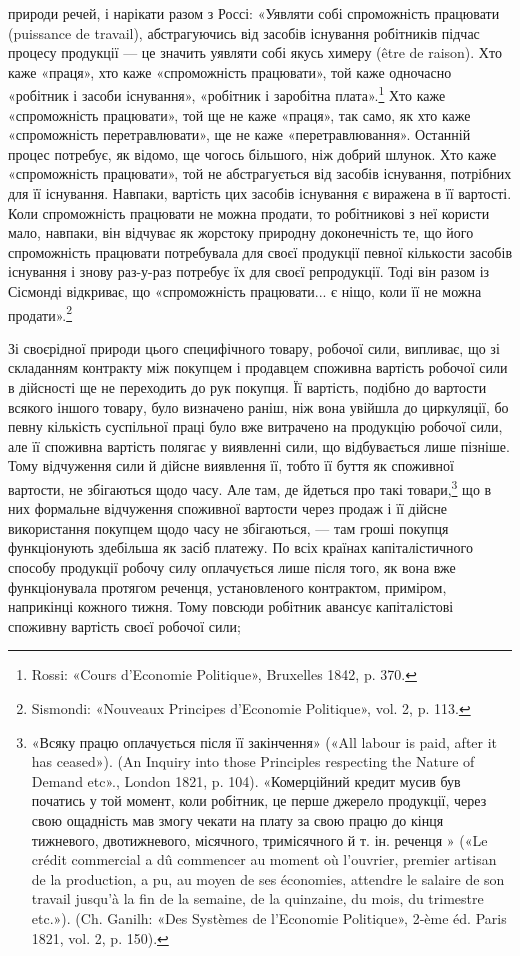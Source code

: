 \parcont{}  %
природи речей, і нарікати разом з Россі: «Уявляти собі спроможність
працювати (puissance de travail), абстрагуючись від засобів
існування робітників підчас процесу продукції — це значить
уявляти собі якусь химеру (être de raison). Хто каже «праця»,
хто каже «спроможність працювати», той каже одночасно «робітник
і засоби існування», «робітник і заробітна плата».\footnote{
Rossi: «Cours d’Economie Politique», Bruxelles 1842, p. 370.
} Хто
каже «спроможність працювати», той ще не каже «праця», так
само, як хто каже «спроможність перетравлювати», ще не каже
«перетравлювання». Останній процес потребує, як відомо, ще
чогось більшого, ніж добрий шлунок. Хто каже «спроможність
працювати», той не абстрагується від засобів існування, потрібних
для її існування. Навпаки, вартість цих засобів існування
є виражена в її вартості. Коли спроможність працювати не можна
продати, то робітникові з неї користи мало, навпаки, він відчуває
як жорстоку природну доконечність те, що його спроможність
працювати потребувала для своєї продукції певної кількости засобів
існування і знову раз-у-раз потребує їх для своєї репродукції.
Тоді він разом із Сісмонді відкриває, що «спроможність
працювати... є ніщо, коли її не можна продати».\footnote{
Sismondi: «Nouveaux Principes d’Economie Politique», vol. 2, p. 113.
}

Зі своєрідної природи цього специфічного товару, робочої
сили, випливає, що зі складанням контракту між покупцем і
продавцем споживна вартість робочої сили в дійсності ще не
переходить до рук покупця. Її вартість, подібно до вартости
всякого іншого товару, було визначено раніш, ніж вона увійшла
до циркуляції, бо певну кількість суспільної праці було вже
витрачено на продукцію робочої сили, але її споживна вартість
полягає у виявленні сили, що відбувається лише пізніше. Тому
відчуження сили й дійсне виявлення її, тобто її буття як споживної
вартости, не збігаються щодо часу. Але там, де йдеться
про такі товари,\footnote{
«Всяку працю оплачується після її закінчення» («All labour is
paid, after it has ceased»). (An Inquiry into those Principles respecting
the Nature of Demand etc»., London 1821, p. 104). «Комерційний кредит
мусив був початись у той момент, коли робітник, це перше джерело продукції,
через свою ощадність мав змогу чекати на плату за свою працю
до кінця тижневого, двотижневого, місячного, тримісячного й т. ін. реченця
» («Le crédit commercial a dû commencer au moment où l’ouvrier,
premier artisan de la production, a pu, au moyen de ses économies, attendre
le salaire de son travail jusqu’à la fin de la semaine, de la quinzaine, du
mois, du trimestre etc.»). (Ch. Ganilh: «Des Systèmes de l’Economie
Politique», 2-ème éd. Paris 1821, vol. 2, p. 150).
} що в них формальне відчуження споживної
вартости через продаж і її дійсне використання покупцем щодо
часу не збігаються, — там гроші покупця функціонують здебільша
як засіб платежу. По всіх країнах капіталістичного способу
продукції робочу силу оплачується лише після того, як вона
вже функціонувала протягом реченця, установленого контрактом,
приміром, наприкінці кожного тижня. Тому повсюди робітник
авансує капіталістові споживну вартість своєї робочої сили;
\parbreak{}  %
